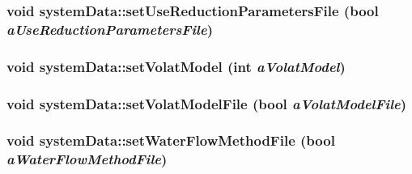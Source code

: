 \label{classsystem_data_ab0311529bdd84d8662d3b9b6de4a95da}
\hypertarget{classsystem_data_a9effb768a403ebc73375ae856c3717ca}{
\subsubsection[{setUseReductionParametersFile}]{\setlength{\rightskip}{0pt plus 5cm}void systemData::setUseReductionParametersFile (bool {\em aUseReductionParametersFile})}}
\label{classsystem_data_a9effb768a403ebc73375ae856c3717ca}
\hypertarget{classsystem_data_ad9a48856bb462d674cac9f86cffa6738}{
\subsubsection[{setVolatModel}]{\setlength{\rightskip}{0pt plus 5cm}void systemData::setVolatModel (int {\em aVolatModel})}}
\label{classsystem_data_ad9a48856bb462d674cac9f86cffa6738}
\hypertarget{classsystem_data_a24227d9d1a95638fdc1033d564f7ced6}{
\subsubsection[{setVolatModelFile}]{\setlength{\rightskip}{0pt plus 5cm}void systemData::setVolatModelFile (bool {\em aVolatModelFile})}}
\label{classsystem_data_a24227d9d1a95638fdc1033d564f7ced6}
\hypertarget{classsystem_data_a3426eaf406fa4f132ff4e7ba1a8296c6}{
\subsubsection[{setWaterFlowMethodFile}]{\setlength{\rightskip}{0pt plus 5cm}void systemData::setWaterFlowMethodFile (bool {\em aWaterFlowMethodFile})}}
